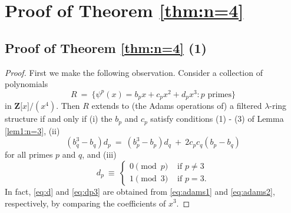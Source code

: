 \documentclass[reqno,11pt]{amsart}
\numberwithin{equation}{subsection}  %
\newcommand{\bZ}{\mathbf{Z}}
\begin{document}


\section{Proof of Theorem \ref{thm:n=4}}
\label{sec:n=4}




\subsection{Proof of Theorem \ref{thm:n=4} (1)}
\begin{proof}
First we make the following observation.  Consider a collection of polynomials    \[
   R ~=~ \lbrace \psi^p(x) = b_p x + c_p x^2 + d_p x^3 \colon p \text{ primes} \rbrace
   \]
in $\bZ \lbrack x \rbrack/(x^4)$.  Then $R$ extends to (the Adams operations of) a filtered $\lambda$-ring structure if and only if (i) the $b_p$ and $c_p$ satisfy conditions (1) - (3) of Lemma \ref{lem1:n=3}, (ii)
   \begin{equation}
   \label{eq:d}
   (b_q^3 - b_q)d_p
   ~=~ (b_p^3 - b_p)d_q ~+~ 2c_p c_q(b_p - b_q)
   \end{equation}
for all primes $p$ and $q$, and (iii)
   \begin{equation}
   \label{eq:dp3}
   d_p ~\equiv~ \begin{cases} 0 \pmod p & \text{ if } p \not= 3 \\
                              1 \pmod 3 & \text{ if } p = 3. \end{cases}
   \end{equation}
In fact, \eqref{eq:d} and \eqref{eq:dp3} are obtained from \eqref{eq:adams1} and \eqref{eq:adams2}, respectively, by comparing the coefficients of $x^3$.



\end{proof}
\end{document}
